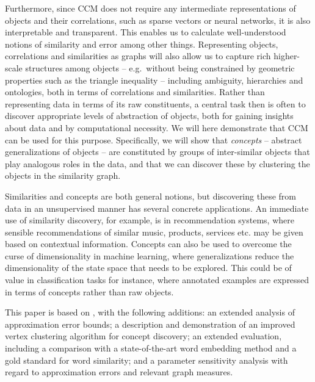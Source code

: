 \documentclass{kais}
\begin{document}
Furthermore, since CCM does not require any intermediate representations of objects and their correlations, such as sparse vectors
 or neural networks, it is also interpretable and transparent. This enables us to calculate well-understood notions
of similarity and error among other things. Representing objects, correlations and similarities as graphs will also allow us
 to capture rich higher-scale structures among objects -- e.g.\ without being constrained by geometric properties such as the triangle 
inequality -- including ambiguity, hierarchies and ontologies, both in terms of correlations and similarities.
Rather than representing data in terms of its raw constituents, a central task then is often to discover appropriate levels of abstraction 
of objects, both for gaining insights about data and by computational necessity. We will here demonstrate that CCM can be used for this purpose. Specifically, we will show 
that \emph{concepts} -- abstract generalizations of objects -- are constituted by groups of inter-similar objects that play 
analogous roles in the data, and that we can discover these by clustering the objects in the similarity graph.

Similarities and concepts are both general notions, but discovering these from data in an unsupervised manner has several concrete
applications. An immediate use of similarity discovery, for example, is in recommendation systems, where sensible recommendations of
similar music, products, services etc. may be given based on contextual information. Concepts 
can also be used to overcome the curse of dimensionality in machine learning, where generalizations reduce
the dimensionality of the state space that needs to be explored. This could be of value in classification tasks for instance, 
where annotated examples are expressed in terms of concepts rather than raw objects. 

This paper is based on \cite{Gornerup2015}, with the following additions: an extended analysis of approximation error bounds; a description
and demonstration of an improved vertex clustering algorithm for concept discovery; an extended evaluation, including a comparison with a 
state-of-the-art word embedding method and a gold standard for word similarity; and a parameter sensitivity analysis with regard to approximation 
errors and relevant graph measures.
\end{document}
